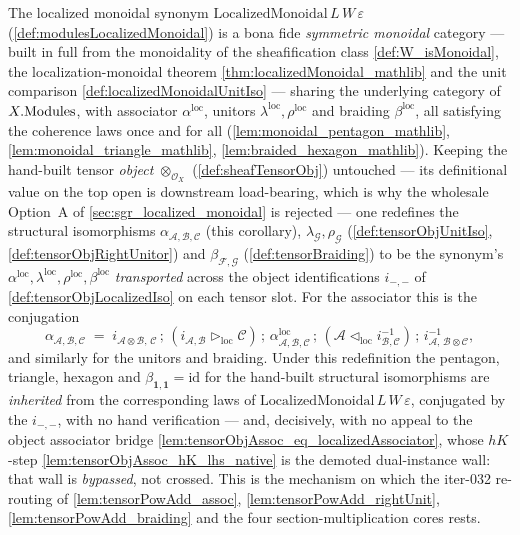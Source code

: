 The localized monoidal synonym \(\mathrm{LocalizedMonoidal}\,L\,W\,\varepsilon\)
(\cref{def:modulesLocalizedMonoidal}) is a bona fide \emph{symmetric monoidal}
category --- built in full from the monoidality of the sheafification class
\cref{def:W_isMonoidal}, the localization-monoidal theorem
\cref{thm:localizedMonoidal_mathlib} and the unit comparison
\cref{def:localizedMonoidalUnitIso} --- sharing the underlying category of
\(X.\mathrm{Modules}\), with associator \(\alpha^{\mathrm{loc}}\), unitors
\(\lambda^{\mathrm{loc}},\rho^{\mathrm{loc}}\) and braiding
\(\beta^{\mathrm{loc}}\), all satisfying the coherence laws once and for all
(\cref{lem:monoidal_pentagon_mathlib}, \cref{lem:monoidal_triangle_mathlib},
\cref{lem:braided_hexagon_mathlib}). Keeping the hand-built tensor \emph{object}
\(\otimes_{\mathcal{O}_X}\) (\cref{def:sheafTensorObj}) untouched --- its
definitional value on the top open is downstream load-bearing, which is why the
wholesale Option~A of \cref{sec:sgr_localized_monoidal} is rejected --- one
redefines the structural isomorphisms
\(\alpha_{\mathcal{A},\mathcal{B},\mathcal{C}}\) (this corollary),
\(\lambda_{\mathcal{G}}, \rho_{\mathcal{G}}\) (\cref{def:tensorObjUnitIso},
\cref{def:tensorObjRightUnitor}) and \(\beta_{\mathcal{F},\mathcal{G}}\)
(\cref{def:tensorBraiding}) to be the synonym's
\(\alpha^{\mathrm{loc}},\lambda^{\mathrm{loc}},\rho^{\mathrm{loc}},
\beta^{\mathrm{loc}}\) \emph{transported} across the object identifications
\(i_{-,-}\) of \cref{def:tensorObjLocalizedIso} on each tensor slot. For the
associator this is the conjugation
\[
  \alpha_{\mathcal{A},\mathcal{B},\mathcal{C}}
    \;=\;
    i_{\mathcal{A}\otimes\mathcal{B},\,\mathcal{C}}
    \,;\, (i_{\mathcal{A},\mathcal{B}} \rhd_{\mathrm{loc}} \mathcal{C})
    \,;\, \alpha^{\mathrm{loc}}_{\mathcal{A},\mathcal{B},\mathcal{C}}
    \,;\, (\mathcal{A} \lhd_{\mathrm{loc}} i_{\mathcal{B},\mathcal{C}}^{-1})
    \,;\, i_{\mathcal{A},\,\mathcal{B}\otimes\mathcal{C}}^{-1},
\]
and similarly for the unitors and braiding. Under this redefinition the pentagon,
triangle, hexagon and \(\beta_{\mathbf{1},\mathbf{1}} = \mathrm{id}\) for the
hand-built structural isomorphisms are \emph{inherited} from the corresponding
laws of \(\mathrm{LocalizedMonoidal}\,L\,W\,\varepsilon\), conjugated by the
\(i_{-,-}\), with no hand verification --- and, decisively, with no appeal to the
object associator bridge \cref{lem:tensorObjAssoc_eq_localizedAssociator}, whose
\(hK\)-step \cref{lem:tensorObjAssoc_hK_lhs_native} is the demoted dual-instance
wall: that wall is \emph{bypassed}, not crossed. This is the mechanism on which
the iter-032 re-routing of \cref{lem:tensorPowAdd_assoc},
\cref{lem:tensorPowAdd_rightUnit}, \cref{lem:tensorPowAdd_braiding} and the four
section-multiplication cores rests.


